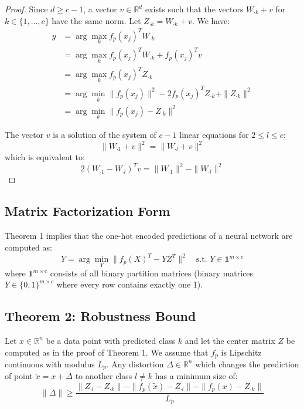 \begin{proof}
Since $d \geq c - 1$, a vector $v \in \mathbb{R}^d$ exists such that the vectors $W_{\cdot k} + v$ for $k \in \{1,\ldots,c\}$ have the same norm. Let $Z_{\cdot k} = W_{\cdot k} + v$. We have:
\begin{align}
y &= \arg \max_k f_p(x_j)^T W_{\cdot k} \\
&= \arg \max_k f_p(x_j)^T W_{\cdot k} + f_p(x_j)^T v \\
&= \arg \max_k f_p(x_j)^T Z_{\cdot k} \\
&= \arg \min_k \|f_p(x_j)\|^2 - 2f_p(x_j)^T Z_{\cdot k} + \|Z_{\cdot k}\|^2 \\
&= \arg \min_k \|f_p(x_j) - Z_{\cdot k}\|^2
\end{align}

The vector $v$ is a solution of the system of $c - 1$ linear equations for $2 \leq l \leq c$:
\begin{equation}
\|W_{\cdot 1} + v\|^2 = \|W_{\cdot l} + v\|^2
\end{equation}
which is equivalent to:
\begin{equation}
2(W_{\cdot 1} - W_{\cdot l})^T v = \|W_{\cdot 1}\|^2 - \|W_{\cdot l}\|^2
\end{equation}
\end{proof}

\subsection{Matrix Factorization Form}

Theorem 1 implies that the one-hot encoded predictions of a neural network are computed as:
\begin{equation}
\hat{Y} = \arg \min_Y \|f_p(X)^T - YZ^T\|^2 \quad \text{s.t. } Y \in \mathbf{1}^{m \times c}
\end{equation}
where $\mathbf{1}^{m \times c}$ consists of all binary partition matrices (binary matrices $Y \in \{0,1\}^{m \times c}$ where every row contains exactly one 1).

\subsection{Theorem 2: Robustness Bound}

\begin{theorem}
Let $x \in \mathbb{R}^n$ be a data point with predicted class $k$ and let the center matrix $Z$ be computed as in the proof of Theorem 1. We assume that $f_p$ is Lipschitz continuous with modulus $L_p$. Any distortion $\Delta \in \mathbb{R}^n$ which changes the prediction of point $\tilde{x} = x + \Delta$ to another class $l \neq k$ has a minimum size of:
\begin{equation}
\|\Delta\| \geq \frac{\|Z_{\cdot l} - Z_{\cdot k}\| - \|f_p(\tilde{x}) - Z_{\cdot l}\| - \|f_p(x) - Z_{\cdot k}\|}{L_p}
\end{equation}
\end{theorem}

